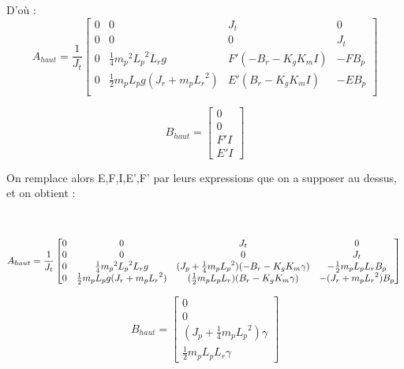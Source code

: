 \documentclass[12pt, a4paper, openany]{report}
\begin{document}
D’où :\\ 
\begin{equation*}
    A_{haut} = \frac{1}{J_t} \begin{bmatrix}
0 & 0 & J_t & 0\\
0 & 0 & 0 & J_t\\
0 & \frac{1}{4}{m_p}^2{L_p}^2L_rg & F'(-B_r-K_gK_mI)& -FB_p \\
0 & \frac{1}{2}m_pL_pg(J_r+m_p{L_r}^2) & E'(B_r-K_gK_mI) & -EB_p\\
\end{bmatrix}
\end{equation*}

\begin{equation*}
    B_{haut} = \begin{bmatrix}
    0\\ 
    0\\ 
    F'I\\ 
    E'I
\end{bmatrix}
\end{equation*}

On remplace alors E,F,I,E',F' par leurs expressions que on a supposer au dessus, et on obtient :\\\\\\ 
\begin{equation*}
    A_{haut} = \frac{1}{J_t} \begin{bmatrix}
0 & 0 & J_t & 0\\
0 & 0 & 0 & J_t\\
0 & \frac{1}{4}{m_p}^2{L_p}^2L_rg & (J_p+\frac{1}{4}m_p{L_p}^2)(-B_r-K_gK_m\gamma)& -\frac{1}{2}m_pL_pL_rB_p \\
0 & \frac{1}{2}m_pL_pg(J_r+m_p{L_r}^2) & (\frac{1}{2}m_pL_pL_r)(B_r-K_gK_m\gamma) & -(J_r+m_p{L_r}^2)B_p\\
\end{bmatrix}\\\\\\
\end{equation*}

\begin{equation*}
    B_{haut} = \begin{bmatrix}
    0\\ 
    0\\ 
    (J_p+ \frac{1}{4}m_p{L_p}^2)\gamma\\ 
    \frac{1}{2}m_pL_pL_r\gamma 
\end{bmatrix}
\end{equation*}
\end{document}
